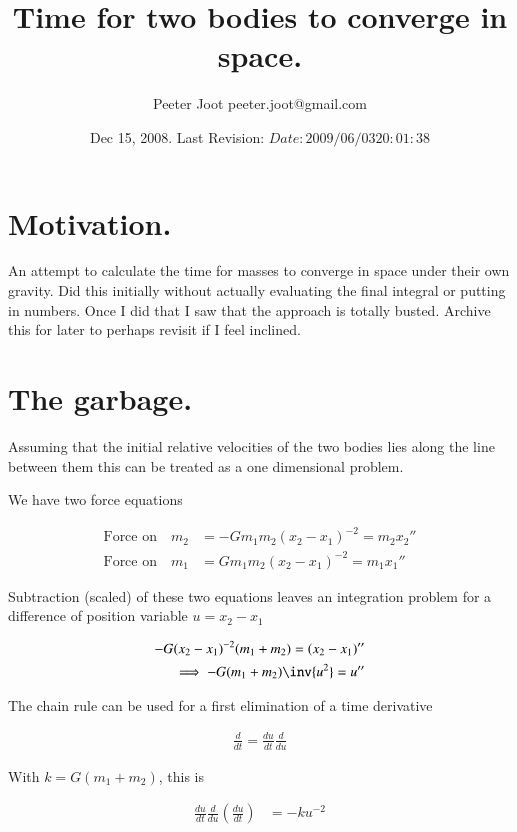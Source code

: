 \documentclass{article}
\title{ Time for two bodies to converge in space. }
\author{Peeter Joot \quad peeter.joot@gmail.com}
\date{ Dec 15, 2008.  Last Revision: $Date: 2009/06/03 20:01:38 $ }
\begin{document}
\maketitle{}


\section{Motivation.}

An attempt to calculate the time for masses to converge in space under their own gravity.  Did this initially without actually evaluating the final
integral or putting in numbers.  Once I did that I saw that the approach is totally busted.  Archive this for later to perhaps revisit if I feel
inclined.

\section{The garbage. }

Assuming that the initial relative velocities of the two bodies lies along
the line between them this can be treated as a one dimensional problem.

We have two force equations

\begin{align*}
\text{Force on} \quad m_2 &= - G m_1 m_2 (x_2 - x_1)^{-2} = m_2 {x_2}'' \\
\text{Force on} \quad m_1 &=  G m_1 m_2 (x_2 - x_1)^{-2} = m_1 {x_1}''
\end{align*}

Subtraction (scaled) of these two equations leaves an integration problem for a difference of position variable $u = x_2 - x_1$

\begin{align*}
- G (x_2 - x_1)^{-2} (m_1 + m_2)= (x_2 - x_1)'' \\
\implies
- G (m_1 + m_2) \inv{u^2} = u'' \\
\end{align*}

The chain rule can be used for a first elimination of a time derivative

\begin{align*}
\frac{d}{dt} = \frac{du}{dt} \frac{d}{du}
\end{align*}

With $k = G(m_1 + m_2)$, this is

\begin{align*}
\frac{du}{dt} \frac{d}{du} \left(\frac{du}{dt}\right) &= -k u^{-2}
\end{align*}
\end{document}
